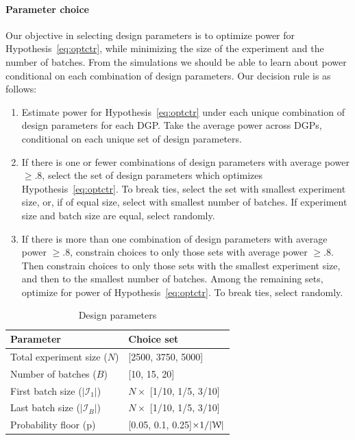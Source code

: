 \documentclass[letterpaper, 12pt, parskip=full,]{scrartcl}
\begin{document}
\paragraph{Parameter choice}
Our objective in selecting design parameters is to optimize power for Hypothesis~\ref{eq:optctr}, while minimizing the size of the experiment and the number of batches. From the simulations we should be able to learn about power conditional on each combination of design parameters. Our decision rule is as follows:
\begin{enumerate}
\item Estimate power for Hypothesis~\ref{eq:optctr} under each unique combination of design parameters for each DGP. Take the average power across DGPs, conditional on each unique set of design parameters. 
\item If there is one or fewer combinations of design parameters with average power $\ge.8$, select the set of design parameters which optimizes Hypothesis~\ref{eq:optctr}. To break ties, select the set with smallest experiment size, or, if of equal size, select with smallest number of batches. If experiment size and batch size are equal, select randomly. 
\item If there is more than one combination of design parameters with average power $\ge.8$, constrain choices to only those sets with average power $\ge.8$. Then constrain choices to only those sets with the smallest experiment size, and then to the smallest number of batches. Among the remaining sets, optimize for power of Hypothesis~\ref{eq:optctr}. To break ties, select randomly. 
\end{enumerate}

\begin{table}[H]
\centering
\caption{Design parameters} 
\label{tab:design}
\begin{tabular}{l | l}
\textbf{Parameter} & \textbf{Choice set} \\ \hline
Total experiment size ($N$)& [2500, 3750, 5000] \\
Number of batches ($B$)& [10, 15, 20] \\
First batch size ($|\mathcal{I}_1|$) & $N \times$ [1/10, 1/5, 3/10] \\
Last batch size ($|\mathcal{I}_B|$) &  $N \times$ [1/10, 1/5, 3/10] \\
Probability floor (p)& [0.05, 0.1, 0.25]$\times 1/ |{\EuScript W}|$ \\
\hline
\end{tabular}
\end{table}
\end{document}
